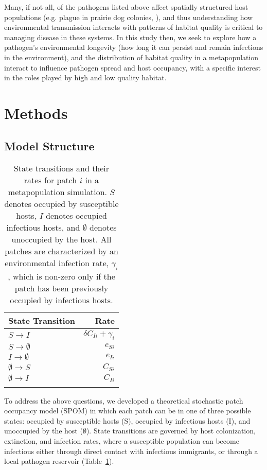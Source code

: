 \documentclass{svjour3}
\begin{document}
Many, if not all, of the pathogens listed above affect spatially structured host populations (e.g. plague in prairie dog colonies, \cite{George2013}), and thus understanding how environmental transmission interacts with patterns of habitat quality is critical to managing disease in these systems.  In this study then, we seek to explore how a pathogen's environmental longevity (how long it can persist and remain infections in the environment), and the distribution of habitat quality in a metapopulation interact to influence pathogen spread and host occupancy, with a specific interest in the roles played by high and low quality habitat.  

\section{Methods}
\label{methods}

\subsection{Model Structure}

\begin{table}
\caption{State transitions and their rates for patch $i$ in a metapopulation simulation.  $S$ denotes occupied by  susceptible hosts, $I$ denotes occupied infectious hosts, and $\emptyset$ denotes unoccupied by the host.  All patches are characterized by an environmental infection rate, $\gamma_i$, which is non-zero only if the patch has been previously occupied by infectious hosts.}
\begin{tabular}{lr}
State Transition & Rate \\
\hline
$S \rightarrow I$ & $\delta C_{Ii} + \gamma_i$\\
$S \rightarrow \emptyset $ & $e_{Si}$\\
$I \rightarrow \emptyset $ & $e_{Ii}$ \\
$\emptyset \rightarrow S$ & $C_{Si}$\\
$\emptyset \rightarrow I$ & $C_{Ii}$\\
\label{transitions}
\end{tabular}
\end{table}

To address the above questions, we developed a theoretical stochastic patch occupancy model (SPOM) in which each patch can be in one of three possible states: occupied by susceptible hosts (S), occupied by infectious hosts (I), and unoccupied by the host ($\emptyset$).  State transitions are governed by host colonization, extinction, and infection rates, where a susceptible population can become infectious either through direct contact with infectious immigrants, or through a local pathogen reservoir (Table~\ref{transitions}).
\end{document}
